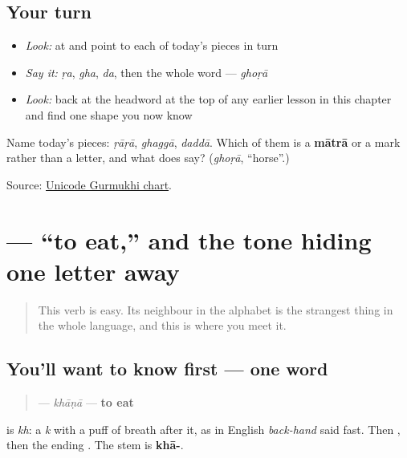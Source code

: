 \subsection*{Your turn}
\begin{itemize}
\raggedright
  \item \emph{Look:} at \textbf{} and point to each of today's pieces in turn
  \item \emph{Say it:} \emph{ṛa}, \emph{gha}, \emph{da}, then the whole word — \emph{ghoṛā}
  \item \emph{Look:} back at the headword at the top of any earlier lesson in this chapter and find one shape you now know
\end{itemize}

\begin{tcolorbox}[breakable,colback=teal!4,colframe=teal!35!black,title={Before you move on}]
Name today's pieces: \emph{ṛāṛā}, \emph{ghaggā}, \emph{daddā}. Which of them is a \textbf{mātrā} or a mark rather than a letter, and what does \textbf{} say? (\emph{ghoṛā}, “horse”.)

Source: \href{https://www.unicode.org/charts/PDF/U0A00.pdf}{Unicode Gurmukhi chart}.
\end{tcolorbox}
\section[\texorpdfstring{\pa{ਖਾਣਾ} (khāṇā)}{ਖਾਣਾ (khāṇā)}]{ — “to eat,” and the tone hiding one letter away}

\label{lesson:PA-C07-khana}



\begin{quote}
This verb is easy. Its neighbour in the alphabet is the strangest thing in the whole language, and this is where you meet it.
\end{quote}

\subsection*{You'll want to know first — one word}
\begin{quote}
\textbf{} — \emph{khāṇā} — \textbf{to eat}
\end{quote}

\textbf{} is \emph{kh}: a \emph{k} with a puff of breath after it, as in English \emph{back-hand} said fast. Then \textbf{}, then the ending \textbf{}. The stem is \textbf{khā-}.


